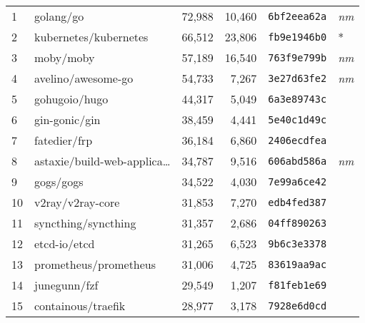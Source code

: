 {\fontsize{5.1}{6}\selectfont
    \begin{supertabular}{llrrll}

        1   &                          golang/go & 72,988 & 10,460 &  \texttt{6bf2eea62a} &  \textit{nm} \\
        2   &              kubernetes/kubernetes & 66,512 & 23,806 &  \texttt{fb9e1946b0} &            * \\
        3   &                          moby/moby & 57,189 & 16,540 &  \texttt{763f9e799b} &  \textit{nm} \\
        4   &                 avelino/awesome-go & 54,733 &  7,267 &  \texttt{3e27d63fe2} &  \textit{nm} \\
        5   &                      gohugoio/hugo & 44,317 &  5,049 &  \texttt{6a3e89743c} &              \\
        6   &                      gin-gonic/gin & 38,459 &  4,441 &  \texttt{5e40c1d49c} &              \\
        7   &                       fatedier/frp & 36,184 &  6,860 &  \texttt{2406ecdfea} &              \\
        8   &    astaxie/build-web-applica\ldots & 34,787 &  9,516 &  \texttt{606abd586a} &  \textit{nm} \\
        9   &                          gogs/gogs & 34,522 &  4,030 &  \texttt{7e99a6ce42} &              \\
        10  &                   v2ray/v2ray-core & 31,853 &  7,270 &  \texttt{edb4fed387} &              \\
        11  &                syncthing/syncthing & 31,357 &  2,686 &  \texttt{04ff890263} &              \\
        12  &                       etcd-io/etcd & 31,265 &  6,523 &  \texttt{9b6c3e3378} &              \\
        13  &              prometheus/prometheus & 31,006 &  4,725 &  \texttt{83619aa9ac} &              \\
        14  &                       junegunn/fzf & 29,549 &  1,207 &  \texttt{f81feb1e69} &              \\
        15  &                 containous/traefik & 28,977 &  3,178 &  \texttt{7928e6d0cd} &              \\

\end{supertabular}}
